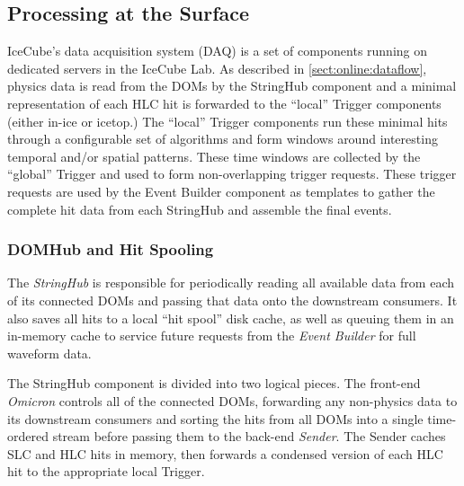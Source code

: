 \subsection{Processing at the Surface}

IceCube's data acquisition system (DAQ) is a set of components running on
dedicated servers in the IceCube Lab.  As described in \ref{sect:online:dataflow}, physics data is read from the DOMs by the StringHub
component and a minimal representation of each HLC hit is forwarded to the
``local'' Trigger components (either in-ice or icetop.)
The ``local'' Trigger components run these
minimal hits through a configurable set of algorithms and form windows around
interesting temporal and/or spatial patterns.  These time windows are collected
by the ``global'' Trigger and used to form non-overlapping trigger requests.
These trigger requests are used by the Event Builder component as templates to
gather the complete hit data from each StringHub and assemble the final events.

\subsubsection{DOMHub and Hit Spooling}

The \emph{StringHub} is responsible for periodically reading all available data
from each of its connected DOMs and passing that data onto the downstream
consumers.  It also saves all hits to a local ``hit spool'' disk cache, as
well as queuing them in an in-memory cache to service future requests from
the \emph{Event Builder} for full waveform data.

The StringHub component is divided into two logical pieces.  The front-end
\emph{Omicron} controls all of the connected DOMs, forwarding any
non-physics data to its downstream consumers and sorting the hits from all
DOMs into a single time-ordered stream
before passing them to the back-end \emph{Sender}.  The Sender
caches SLC and HLC hits in memory, then forwards a condensed version of
each HLC hit to the appropriate local Trigger.


